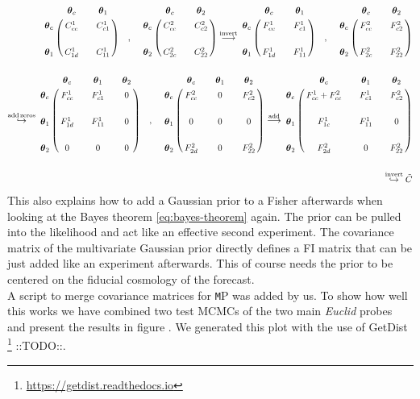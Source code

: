 \documentclass[oneside]{book}
\newcommand*{\Euclid}{\textit{Euclid}\xspace}
\newcommand*{\marktodo}{{\color{mmcol} ::TODO::}\xspace}
\newcommand*{\montepython}{\texttt MP\xspace}
\begin{document}
\begin{align*}
    \bordermatrix{~ & \boldsymbol{\theta}_c && \boldsymbol{\theta}_1 \cr
    \boldsymbol{\theta}_c &C^1_{cc}&& C^1_{c1}\cr
    \cr
    \boldsymbol{\theta}_1 &C^1_{1d}&& C^1_{11}\cr } \quad ,\quad 
    \bordermatrix{~ & \boldsymbol{\theta}_c && \boldsymbol{\theta}_2 \cr
    \boldsymbol{\theta}_c &C^2_{cc}&& C^2_{c2}\cr
    \cr
    \boldsymbol{\theta}_2 &C^2_{2c}&& C^2_{22}\cr } \overset{\mathrm{invert}}{\longrightarrow}
    \bordermatrix{~ & \boldsymbol{\theta}_c && \boldsymbol{\theta}_1 \cr
    \boldsymbol{\theta}_c &F^1_{cc}&& F^1_{c1}\cr
    \cr
    \boldsymbol{\theta}_1 &F^1_{1d}&& F^1_{11}\cr } \quad ,\quad 
    \bordermatrix{~ & \boldsymbol{\theta}_c && \boldsymbol{\theta}_2 \cr
    \boldsymbol{\theta}_c &F^2_{cc}&& F^2_{c2}\cr
    \cr
    \boldsymbol{\theta}_2 &F^2_{2c}&& F^2_{22}\cr }\\
    \\
    \overset{\mathrm{add\,zeros}}{\hookrightarrow}
    \bordermatrix{~ & \boldsymbol{\theta}_c && \boldsymbol{\theta}_1  &&\boldsymbol{\theta}_2 \cr
    \boldsymbol{\theta}_c &F^1_{cc}&& F^1_{c1} && 0\cr
    \cr
    \boldsymbol{\theta}_1 &F^1_{1d}&& F^1_{11}&& 0\cr 
    \cr
    \boldsymbol{\theta}_2& 0&&0&&0} \quad,\quad 
    \bordermatrix{~ & \boldsymbol{\theta}_c && \boldsymbol{\theta}_1  &&\boldsymbol{\theta}_2 \cr
    \boldsymbol{\theta}_c &F^2_{cc}&&0  && F^2_{c2}\cr
    \cr
    \boldsymbol{\theta}_1 &0&& 0&& 0\cr 
    \cr
    \boldsymbol{\theta}_2& F^2_{2d}&&0&&F^2_{22}} \overset{\mathrm{add}}{\longrightarrow}
    \bordermatrix{~ & \boldsymbol{\theta}_c && \boldsymbol{\theta}_1  &&\boldsymbol{\theta}_2 \cr
    \boldsymbol{\theta}_c &F^1_{cc}+F^2_{cc}&&F^1_{c1}  && F^2_{c2}\cr
    \cr
    \boldsymbol{\theta}_1 &F^1_{1c}&& F^1_{11}&& 0\cr 
    \cr
    \boldsymbol{\theta}_2& F^2_{2d}&&0&&F^2_{22}}\\
    \\
    \overset{\mathrm{invert}}{\hookrightarrow} \tilde{C}
\end{align*}
This also explains how to add a Gaussian prior to a Fisher afterwards when looking at the Bayes theorem \ref{eq:bayes-theorem} again. The prior can be pulled into the likelihood and act like an effective second experiment. The covariance matrix of the multivariate Gaussian prior directly defines a FI matrix that can be just added like an experiment afterwards. This of course needs the prior to be centered on the fiducial cosmology of the forecast.\\
A script to merge covariance matrices for \montepython was added by us. To show how well this works we have combined two test MCMCs of the two main \Euclid probes and present the results in figure . We generated this plot with the use of GetDist \footnote{\href{https://getdist.readthedocs.io}{https://getdist.readthedocs.io}} \marktodo.
\end{document}
